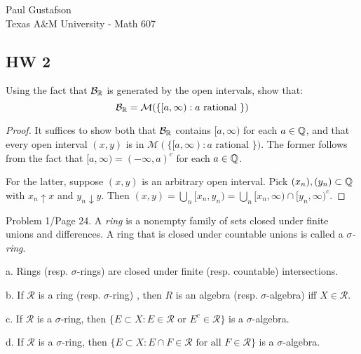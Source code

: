 \documentclass{article}
\begin{document}
\noindent Paul Gustafson\\
\noindent Texas A\&M University - Math 607\\ 

\subsection*{HW 2}
 Using the fact that $\mathcal B_{\mathbb{R}}$ is generated by the open intervals, show that:
$$ \mathcal B_{\mathbb{R}} = \mathcal M (\{ [a, \infty ) : a \text { rational } \} ) $$
\begin{proof}
It suffices to show both that $\mathcal B_{\mathbb{R}}$ contains $[a, \infty )$ for each $a \in \mathbb{Q}$, and that every open interval $(x,y)$ is in $\mathcal M (\{ [a, \infty ) : a \text { rational } \} )$. The former follows from the fact that $[a, \infty) = (-\infty, a)^c$ for each $a \in \mathbb{Q}$. 

For the latter, suppose $(x,y)$ is an arbitrary open interval. Pick $(x_n), (y_n) \subset \mathbb{Q}$ with $x_n \uparrow x$ and $y_n \downarrow y$. Then $(x,y) = \bigcup_n [x_n, y_n) = \bigcup_n [x_n, \infty) \cap [y_n, \infty)^c  $.
\end{proof}

 Problem 1/Page 24. A \emph{ring} is a nonempty family of sets closed under finite unions and differences. A ring that is closed under countable unions is called a \emph{$\sigma$-ring}.

a. Rings (resp. $\sigma$-rings)  are closed under finite (resp. countable) intersections.

b. If $\mathcal R$ is a ring (resp. $\sigma$-ring) , then $R$ is an algebra (resp. $\sigma$-algebra) iff $X \in \mathcal R$.

c. If $\mathcal R$ is a $\sigma$-ring, then $\{ E \subset X : E \in \mathcal R \text{ or } E^c \in \mathcal R \}$ is a $\sigma$-algebra.

d. If $\mathcal R$ is a $\sigma$-ring, then $\{ E \subset X : E \cap F \in \mathcal R \text{ for all } F \in \mathcal R \}$ is a $\sigma$-algebra.
\end{document}
